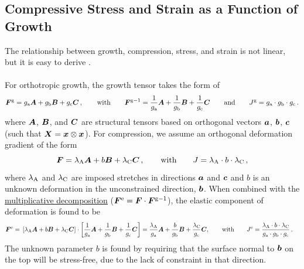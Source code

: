 \documentclass[10pt,letterpaper,oneside]{report}
\newcommand{\ten}[1]{\mbox{\boldmath $#1$}{}}
\newcommand{\scas}[1]{\mbox{{\scriptsize{${\rm{#1}}$}}}{}}
\begin{document}
\begin{itemize}
\chapter{Compressive Stress and Strain as a Function of Growth}

The relationship between growth, compression, stress, and strain is not linear, but it is easy to derive \cite{Holland2017}. 
\\ \\ \noindent 
For orthotropic growth, the growth tensor takes the form of 
\begin{equation}
\ten{F}^{\scas{g}} = g_{\scas{a}} \ten{A} + g_{\scas{b}} \ten{B} + g_{\scas{c}} \ten{C} \, , 
\qquad \mbox{with} \qquad 
\ten{F}^{\scas{g}-1} = \frac{1}{g_{\scas{a}}} \ten{A} + \frac{1}{g_{\scas{b}}} \ten{B} + \frac{1}{g_{\scas{c}}} \ten{C} 
\qquad \mbox{and} \qquad 
J^{\scas{g}} = g_{\scas{a}} \cdot g_{\scas{b}} \cdot g_{\scas{c}} \, .
\end{equation}
where $\ten{A}$, $\ten{B}$, and $\ten{C}$ are structural tensors based on orthogonal vectors $\ten{a}$, $\ten{b}$, $\ten{c}$ (such that $\ten{X} = \ten{x} \otimes \ten{x}$).  
For compression, we assume an orthogonal deformation gradient of the form
\begin{equation}
\ten{F} = \lambda_{\scas{A}} \ten{A} + b \ten{B} + \lambda_{\scas{C}} \ten{C} \, , 
\qquad \mbox{with} \qquad 
J = \lambda_{\scas{A}} \cdot b \cdot \lambda_{\scas{C}} \, , 
\end{equation}
where $\lambda_{\scas{A}}$ and $\lambda_{\scas{C}}$ are imposed stretches in directions $\ten{a}$ and $\ten{c}$ and $b$ is an unknown deformation in the unconstrained direction, $\ten{b}$.  When combined with the \hyperlink{multiplicative}{multiplicative decomposition} ($ \ten{F}^{\scas{e}} = \ten{F} \cdot \ten{F}^{\scas{g}-1} $), the elastic component of deformation is found to be
\begin{align}
\ten{F}^{\scas{e}} ={}& \left[ \lambda_{\scas{A}} \ten{A} + b \ten{B} + \lambda_{\scas{C}} \ten{C} \right] \cdot \left[ \frac{1}{g_{\scas{a}}} \ten{A} + \frac{1}{g_{\scas{b}}} \ten{B} + \frac{1}{g_{\scas{c}}} \ten{C} \right] = \frac{\lambda_{\scas{A}} }{g_{\scas{a}}} \ten{A} + \frac{b}{g_{\scas{b}}} \ten{B} + \frac{\lambda_{\scas{C}} }{g_{\scas{c}}} \ten{C}
, 
\qquad \mbox{with} \qquad
J^{\scas{e}} = \frac{\lambda_{\scas{A}} \cdot b \cdot \lambda_{\scas{C}} }{g_{\scas{a}} \cdot g_{\scas{b}} \cdot g_{\scas{c}}} \, . 
\end{align}
The unknown parameter $b$ is found by requiring that the surface normal to $\ten{b}$ on the top will be stress-free, due to the lack of constraint in that direction.  


\end{itemize}
\end{document}
